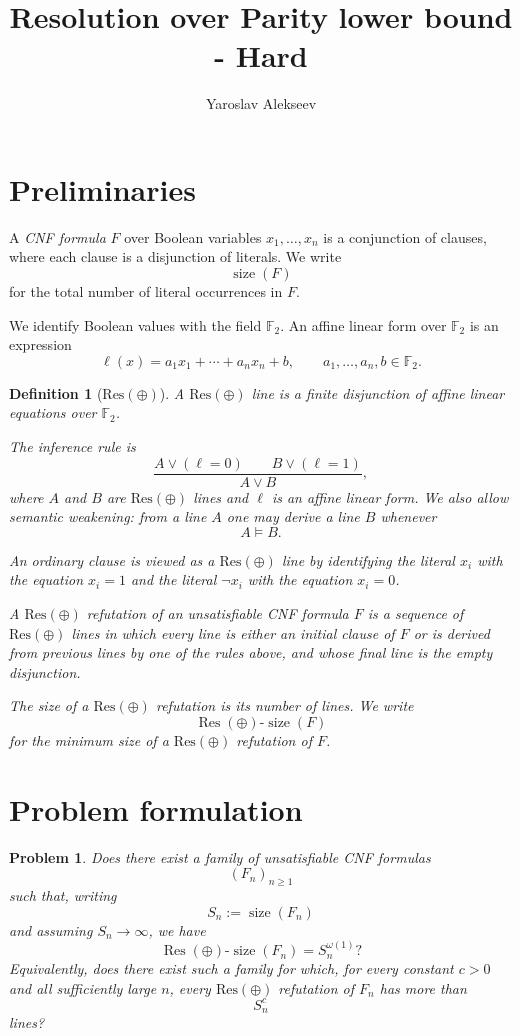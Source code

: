 \documentclass[10pt]{article}
\title{Resolution over Parity lower bound - Hard}
\author{Yaroslav Alekseev}
\date{}
\newtheorem{definition}{Definition}
\newtheorem{problem}{Problem}
\begin{document}
\maketitle

\section{Preliminaries}

A \emph{CNF formula} $F$ over Boolean variables $x_1,\ldots,x_n$ is a
conjunction of clauses, where each clause is a disjunction of literals. We
write
\[
\operatorname{size}(F)
\]
for the total number of literal occurrences in $F$.

We identify Boolean values with the field $\mathbb{F}_2$. An affine linear
form over $\mathbb{F}_2$ is an expression
\[
\ell(x)=a_1x_1+\cdots+a_nx_n+b,
\qquad
a_1,\ldots,a_n,b\in\mathbb{F}_2.
\]

\begin{definition}[$\mathrm{Res}(\oplus)$]
A $\mathrm{Res}(\oplus)$ line is a finite disjunction of affine linear
equations over $\mathbb{F}_2$.

The inference rule is
\[
\frac{
A\vee(\ell=0)
\qquad
B\vee(\ell=1)
}{
A\vee B
},
\]
where $A$ and $B$ are $\mathrm{Res}(\oplus)$ lines and $\ell$ is an affine
linear form. We also allow semantic weakening: from a line $A$ one may derive
a line $B$ whenever
\[
A\models B.
\]

An ordinary clause is viewed as a $\mathrm{Res}(\oplus)$ line by identifying
the literal $x_i$ with the equation $x_i=1$ and the literal $\neg x_i$ with
the equation $x_i=0$.

A $\mathrm{Res}(\oplus)$ refutation of an unsatisfiable CNF formula $F$ is a
sequence of $\mathrm{Res}(\oplus)$ lines in which every line is either an
initial clause of $F$ or is derived from previous lines by one of the rules
above, and whose final line is the empty disjunction.

The \emph{size} of a $\mathrm{Res}(\oplus)$ refutation is its number of lines.
We write
\[
\operatorname{Res}(\oplus)\text{-}\operatorname{size}(F)
\]
for the minimum size of a $\mathrm{Res}(\oplus)$ refutation of $F$.
\end{definition}

\section{Problem formulation}

\begin{problem}
Does there exist a family of unsatisfiable CNF formulas
\[
(F_n)_{n\ge 1}
\]
such that, writing
\[
S_n:=\operatorname{size}(F_n)
\]
and assuming $S_n\to\infty$, we have
\[
\operatorname{Res}(\oplus)\text{-}\operatorname{size}(F_n)
=
S_n^{\omega(1)}?
\]
Equivalently, does there exist such a family for which, for every constant
$c>0$ and all sufficiently large $n$, every $\mathrm{Res}(\oplus)$
refutation of $F_n$ has more than
\[
S_n^c
\]
lines?
\end{problem}
\end{document}

